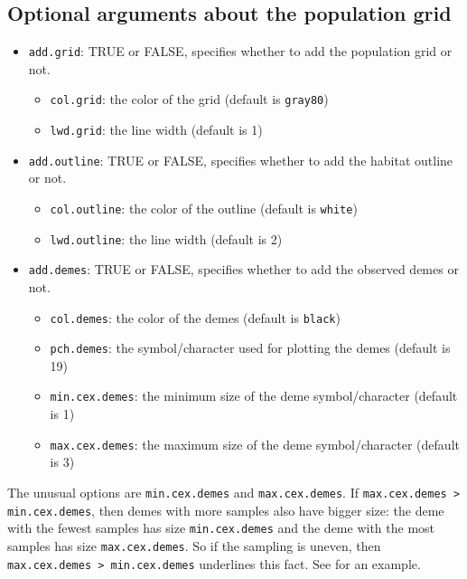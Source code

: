 \documentclass[a4paper,10pt,DIV=15,titlepage,mpinclude=true]{scrartcl}
\newcommand{\keystring}[1]{{\tt #1}}
\begin{document}
\subsection{Optional arguments about the population grid}

\begin{itemize}
  \item \keystring{add.grid}: TRUE or FALSE, specifies whether to add the population grid or not.
  \begin{itemize}
    \item \keystring{col.grid}: the color of the grid (default is \keystring{gray80})
    \item \keystring{lwd.grid}: the line width (default is 1)
  \end{itemize}
  \item \keystring{add.outline}: TRUE or FALSE, specifies whether to add the habitat outline or not.
  \begin{itemize}
    \item \keystring{col.outline}: the color of the outline (default is \keystring{white})
    \item \keystring{lwd.outline}: the line width (default is 2)
  \end{itemize}
  \item \keystring{add.demes}: TRUE or FALSE, specifies whether to add the observed demes or not. 
  \begin{itemize}
    \item \keystring{col.demes}: the color of the demes (default is \keystring{black})
    \item \keystring{pch.demes}: the symbol/character used for plotting the demes (default is 19)
    \item \keystring{min.cex.demes}: the minimum size of the deme symbol/character (default is 1)
    \item \keystring{max.cex.demes}: the maximum size of the deme symbol/character (default is 3)
  \end{itemize}
\end{itemize}

The unusual options are \keystring{min.cex.demes} and \keystring{max.cex.demes}. If \keystring{max.cex.demes > min.cex.demes}, then demes with more samples also have bigger size: the deme with the fewest samples has size \keystring{min.cex.demes} and the deme with the most samples has size \keystring{max.cex.demes}. So if the sampling is uneven, then \keystring{max.cex.demes > min.cex.demes} underlines this fact. See  for an example.
\end{document}
